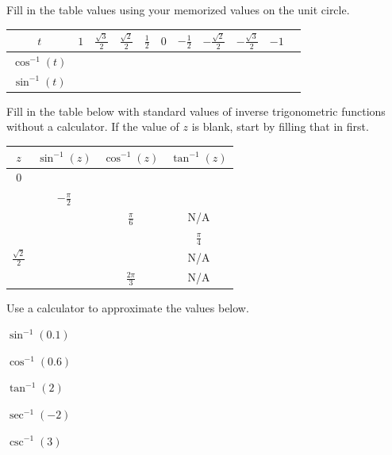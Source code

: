 \begin{myPractice}
	Fill in the table values using your memorized values on the unit circle.
	\begin{center}
			\renewcommand{\arraystretch}{1.5} 
				\begin{tabular}{|| c | P{1cm} | P{1cm} | P{1cm} | P{1cm} | P{1cm} | P{1cm} | P{1cm} | P{1cm} | P{1cm} | P{1cm} ||}
					\hline
					$t$    & $1$ & $\frac{\sqrt{3}}{2}$ & $\frac{\sqrt{2}}{2}$ & $\frac{1}{2}$ & $0$ & $-\frac{1}{2}$ & $-\frac{\sqrt{2}}{2}$ & $-\frac{\sqrt{3}}{2}$ & $-1$\\
					\hline
					$\cos^{-1}(t)$ & & & & & & & & &\\ 
					\hline
					$\sin^{-1}(t)$ & & & & & & & & &\\ 
					\hline
				\end{tabular}
			\end{center}
\end{myPractice}

\begin{myPractice}
	\begin{multicols}{2}
		Fill in the table below with standard values of inverse trigonometric functions without a calculator. If the value of $z$ is blank, start by filling that in first.
		\columnbreak
		\begin{center}
		\renewcommand{\arraystretch}{1.5} 
			\begin{tabular}{|| c | c | c | c ||}
				\hline
				$z$    					& $\sin^{-1}(z)$ 	& $\cos^{-1}(z)$ 		& $\tan^{-1}(z)$ \\
				\hline
				$0$ 					& 	 				& 				 		& \\
				\hline
										& $-\frac{\pi}{2}$ 	& 		 				& \\
				\hline
										& 				 	& $\frac{\pi}{6}$ 		& N/A \\
				\hline
										& 				 	& 	 					& $\frac{\pi}{4}$ \\
				\hline
				$\frac{\sqrt{2}}{2}$ 	& 				 	& 				 		& N/A \\
				\hline
							 			& 				 	& $\frac{2\pi}{3}$ 		& N/A \\
				\hline
			\end{tabular}
		\end{center}
	\end{multicols}
\end{myPractice}

\begin{myPractice}
	Use a calculator to approximate the values below.
	\begin{enumerate}
	\end{enumerate}
\end{myPractice}
\vfill

